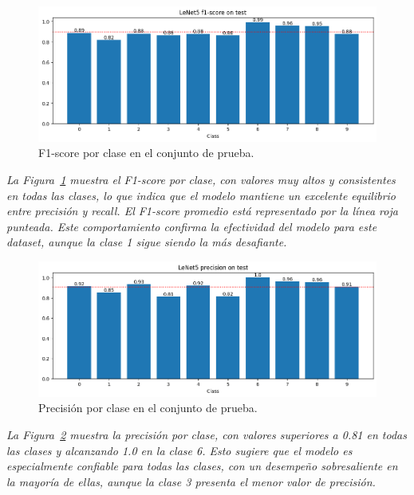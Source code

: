 \documentclass[conference]{IEEEtran}
\begin{document}
\begin{figure}[H]
    \centering
    \includegraphics[width=0.95\linewidth]{graphics-bilateral/bilateral-f1score-test.png}
    \caption{F1-score por clase en el conjunto de prueba.}
    \label{fig:bilateral-f1score-test}
\end{figure}
\noindent\textit{
La Figura~\ref{fig:bilateral-f1score-test} muestra el F1-score por clase, con valores muy altos y consistentes en todas las clases, lo que indica que el modelo mantiene un excelente equilibrio entre precisión y recall. El F1-score promedio está representado por la línea roja punteada. Este comportamiento confirma la efectividad del modelo para este dataset, aunque la clase 1 sigue siendo la más desafiante.
}

\begin{figure}[H]
    \centering
    \includegraphics[width=0.95\linewidth]{graphics-bilateral/bilateral-precision-test.png}
    \caption{Precisión por clase en el conjunto de prueba.}
    \label{fig:bilateral-precision-test}
\end{figure}
\noindent\textit{
La Figura~\ref{fig:bilateral-precision-test} muestra la precisión por clase, con valores superiores a 0.81 en todas las clases y alcanzando 1.0 en la clase 6. Esto sugiere que el modelo es especialmente confiable para todas las clases, con un desempeño sobresaliente en la mayoría de ellas, aunque la clase 3 presenta el menor valor de precisión.
}
\end{document}
